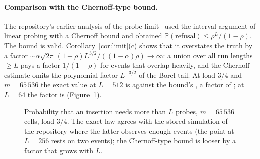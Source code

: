 \documentclass[11pt,a4paper]{article}
\theoremstyle{definition}
\theoremstyle{remark}
\newcommand{\Prob}{\mathbb{P}}
\begin{document}
\paragraph{Comparison with the Chernoff-type bound.} The repository's earlier analysis of the probe limit~\cite{strata} used the interval argument of linear probing with a Chernoff bound and obtained $\Prob(\text{refusal})\le\rho^L/(1-\rho)$. The bound is valid. Corollary~\ref{cor:limit}(c) shows that it overstates the truth by a factor $\sim\alpha\sqrt{2\pi}\,(1-\rho)L^{3/2}/((1-\alpha)\rho)\to\infty$: a union over all run lengths $\ge L$ pays a factor $1/(1-\rho)$ for events that overlap heavily, and the Chernoff estimate omits the polynomial factor $L^{-3/2}$ of the Borel tail. At load $3/4$ and $m=65\,536$ the exact value at $L=512$ is \ExactAtFiveTwelve{} against the bound's \ChernoffAtFiveTwelve{}, a factor of \GapAtFiveTwelve{}; at $L=64$ the factor is \GapAtSixtyFour{} (Figure~\ref{fig:law}).

\begin{figure}[t]
\centering
{}
\caption{Probability that an insertion needs more than $L$ probes, $m=65\,536$ cells, load $3/4$. The exact law agrees with the stored simulation of the repository where the latter observes enough events (the point at $L=256$ rests on two events); the Chernoff-type bound is looser by a factor that grows with $L$.}\label{fig:law}
\end{figure}
\end{document}
